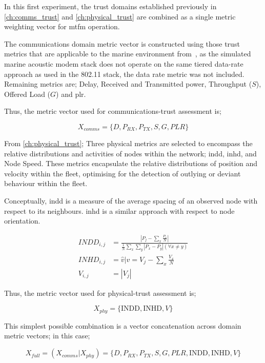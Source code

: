 In this first experiment, the trust domains established previously in \autoref{ch:comms_trust} and \autoref{ch:physical_trust} are combined as a single metric weighting vector for \gls{mtfm} operation.

The communications domain metric vector is constructed using those trust metrics that are applicable to the marine environment from~\cite{Guo2012}, as the simulated marine acoustic modem stack does not operate on the same tiered data-rate approach as used in the 802.11 stack, the data rate metric was not included. Remaining metrics are; Delay, Received and Transmitted power, Throughput ($S$), Offered Load ($G$) and \gls{plr}.

Thus, the metric vector used for communications-trust assessment is;

\begin{equation}
  X_{comms}=\{D, P_{RX}, P_{TX}, S, G, PLR\}
  \label{eq:comms_vector}
\end{equation}

From \autoref{ch:physical_trust}; Three physical metrics are selected to encompass the relative distributions and activities of nodes within the network; \gls{indd}, \gls{inhd}, and Node Speed. These metrics encapsulate the relative distributions of position and velocity within the fleet, optimising for the detection of outlying or deviant behaviour within the fleet.

Conceptually, \gls{indd} is a measure of the average spacing of an observed node with respect to its neighbours. \gls{inhd} is a similar approach with respect to node orientation.

\begin{align}
  INDD_{i,j} &= \frac{|P_j - \sum_x \frac{P_x}{N}|}{\frac{1}{N}\sum_x \sum_y{|P_x - P_y| (\forall x \neq y)}}\\
  INHD_{i,j} &= \hat{v} \vert v= V_j - \sum_x{\frac{V_x}{N}}\\
  V_{i,j} &= |V_j|
\end{align}

Thus, the metric vector used for physical-trust assessment is;

\begin{equation}
  X_{phy}=\{\text{INDD}, \text{INHD}, V\}
  \label{eq:phys:vector}
\end{equation}

This simplest possible combination is a vector concatenation across domain metric vectors; in this case; 

\begin{equation}
  X_{full} =  (X_{comms}|X_{phy}) = \{D, P_{RX}, P_{TX}, S, G, PLR, \text{INDD}, \text{INHD}, V\}
  \label{eq:merge:vector}
\end{equation}


